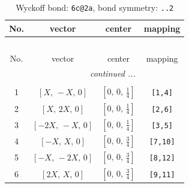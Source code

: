 \documentclass[fleqn,8pt]{jsarticle}
\begin{document}
\begin{longtable}{cccc}
\caption{Wyckoff bond: {\tt 6c@2a}, bond symmetry: {\tt ..2}}
 \\
 \hline \hline
No. & vector & center & mapping \\ \hline \endfirsthead

\multicolumn{3}{l}{\tablename\ \thetable{}} \\
 \hline \hline
No. & vector & center & mapping \\ \hline \endhead

 \hline \hline
\multicolumn{3}{r}{\footnotesize\it continued ...} \\ \endfoot

 \hline \hline
\multicolumn{3}{r}{} \\ \endlastfoot

1 & $\left[ X,\, - X,\, 0 \right]$ & $\left[ 0,\, 0,\, \frac{1}{4} \right]$ & {\tt [1,4]} \\ \hline
2 & $\left[ X,\, 2 X,\, 0 \right]$ & $\left[ 0,\, 0,\, \frac{1}{4} \right]$ & {\tt [2,6]} \\ \hline
3 & $\left[ - 2 X,\, - X,\, 0 \right]$ & $\left[ 0,\, 0,\, \frac{1}{4} \right]$ & {\tt [3,5]} \\ \hline
4 & $\left[ - X,\, X,\, 0 \right]$ & $\left[ 0,\, 0,\, \frac{3}{4} \right]$ & {\tt [7,10]} \\ \hline
5 & $\left[ - X,\, - 2 X,\, 0 \right]$ & $\left[ 0,\, 0,\, \frac{3}{4} \right]$ & {\tt [8,12]} \\ \hline
6 & $\left[ 2 X,\, X,\, 0 \right]$ & $\left[ 0,\, 0,\, \frac{3}{4} \right]$ & {\tt [9,11]} \\
\end{longtable}
\renewcommand{\arraystretch}{1.2}
\end{document}
